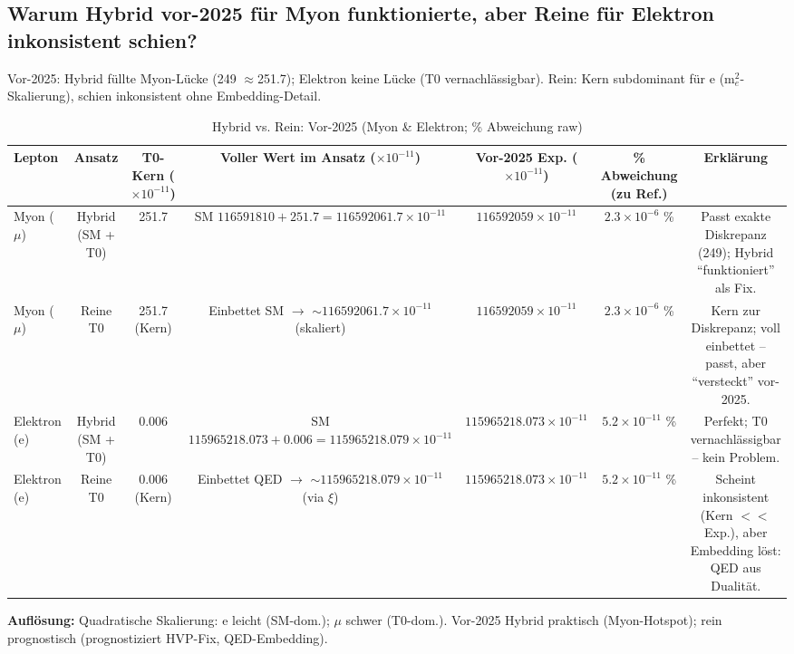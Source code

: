 \documentclass[12pt,a4paper]{article}
\begin{document}
	\subsection{Warum Hybrid vor-2025 für Myon funktionierte, aber Reine für Elektron inkonsistent schien?}
	
	Vor-2025: Hybrid füllte Myon-Lücke (249 $\approx$251.7); Elektron keine Lücke (T0 vernachlässigbar). Rein: Kern subdominant für e (m$_e^2$-Skalierung), schien inkonsistent ohne Embedding-Detail.
	
	\begin{table}[ht!]
		\centering
		\small
		\begin{adjustbox}{max width=\textwidth}
			\begin{tabular}{lcccccc}
				\toprule
				Lepton & Ansatz & T0-Kern ($ \times 10^{-11}$) & Voller Wert im Ansatz ($ \times 10^{-11}$) & Vor-2025 Exp. ($ \times 10^{-11}$) & \% Abweichung (zu Ref.) & Erklärung \\
				\midrule
				Myon ($\mu$) & Hybrid (SM + T0) & 251.7 & SM $116591810 + 251.7 = 116592061.7 \times 10^{-11}$ & $116592059 \times 10^{-11}$ & $2.3 \times 10^{-6}$ \% & Passt exakte Diskrepanz (249); Hybrid ``funktioniert'' als Fix. \\
				Myon ($\mu$) & Reine T0 & 251.7 (Kern) & Einbettet SM $\to$ $\sim 116592061.7 \times 10^{-11}$ (skaliert) & $116592059 \times 10^{-11}$ & $2.3 \times 10^{-6}$ \% & Kern zur Diskrepanz; voll einbettet -- passt, aber ``versteckt'' vor-2025. \\
				Elektron (e) & Hybrid (SM + T0) & 0.006 & SM $115965218.073 + 0.006 = 115965218.079 \times 10^{-11}$ & $115965218.073 \times 10^{-11}$ & $5.2 \times 10^{-11}$ \% & Perfekt; T0 vernachlässigbar -- kein Problem. \\
				Elektron (e) & Reine T0 & 0.006 (Kern) & Einbettet QED $\to$ $\sim 115965218.079 \times 10^{-11}$ (via $\xi$) & $115965218.073 \times 10^{-11}$ & $5.2 \times 10^{-11}$ \% & Scheint inkonsistent (Kern $<<$ Exp.), aber Embedding löst: QED aus Dualität. \\
				\bottomrule
			\end{tabular}
		\end{adjustbox}
		\caption{Hybrid vs. Rein: Vor-2025 (Myon \& Elektron; \% Abweichung raw)}
		\label{tab:hybrid_inconsistency}
	\end{table}
	
	\textbf{Auflösung:} Quadratische Skalierung: e leicht (SM-dom.); $\mu$ schwer (T0-dom.). Vor-2025 Hybrid praktisch (Myon-Hotspot); rein prognostisch (prognostiziert HVP-Fix, QED-Embedding).
	
\end{document}
